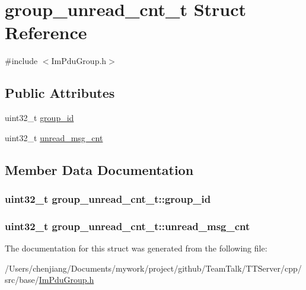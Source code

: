 \hypertarget{structgroup__unread__cnt__t}{}\section{group\+\_\+unread\+\_\+cnt\+\_\+t Struct Reference}
\label{structgroup__unread__cnt__t}


{\ttfamily \#include $<$Im\+Pdu\+Group.\+h$>$}

\subsection*{Public Attributes}
\begin{DoxyCompactItemize}
\item 
uint32\+\_\+t \hyperlink{structgroup__unread__cnt__t_acbb00f30b9cf86f4f1166e082b181cad}{group\+\_\+id}
\item 
uint32\+\_\+t \hyperlink{structgroup__unread__cnt__t_ae6bb3ab53e0f7781c1a0cb7bacc2f87f}{unread\+\_\+msg\+\_\+cnt}
\end{DoxyCompactItemize}


\subsection{Member Data Documentation}
\hypertarget{structgroup__unread__cnt__t_acbb00f30b9cf86f4f1166e082b181cad}{}
\subsubsection[{group\+\_\+id}]{\setlength{\rightskip}{0pt plus 5cm}uint32\+\_\+t group\+\_\+unread\+\_\+cnt\+\_\+t\+::group\+\_\+id}\label{structgroup__unread__cnt__t_acbb00f30b9cf86f4f1166e082b181cad}
\hypertarget{structgroup__unread__cnt__t_ae6bb3ab53e0f7781c1a0cb7bacc2f87f}{}
\subsubsection[{unread\+\_\+msg\+\_\+cnt}]{\setlength{\rightskip}{0pt plus 5cm}uint32\+\_\+t group\+\_\+unread\+\_\+cnt\+\_\+t\+::unread\+\_\+msg\+\_\+cnt}\label{structgroup__unread__cnt__t_ae6bb3ab53e0f7781c1a0cb7bacc2f87f}


The documentation for this struct was generated from the following file\+:\begin{DoxyCompactItemize}
\item 
/\+Users/chenjiang/\+Documents/mywork/project/github/\+Team\+Talk/\+T\+T\+Server/cpp/src/base/\hyperlink{_im_pdu_group_8h}{Im\+Pdu\+Group.\+h}\end{DoxyCompactItemize}
